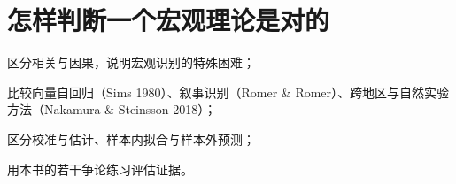 \chapter{怎样判断一个宏观理论是对的}\label{ch:evidence}

\begin{chapterguide}
\begin{guidegoals}
\item 区分相关与因果，说明宏观识别的特殊困难；
\item 比较向量自回归（Sims 1980）、叙事识别（Romer \& Romer）、跨地区与自然实验方法（Nakamura \& Steinsson 2018）；
\item 区分校准与估计、样本内拟合与样本外预测；
\item 用本书的若干争论练习评估证据。
\end{guidegoals}
\end{chapterguide}

\chapterstub
